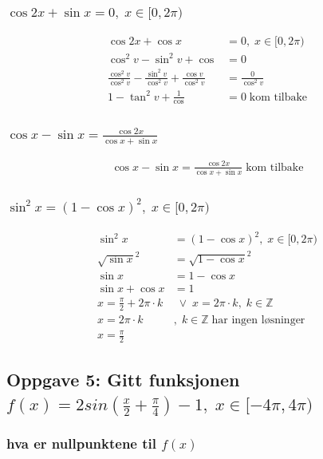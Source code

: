 \documentclass{article}
\begin{document}
\subsubsection{$ \cos 2x + \sin x = 0, \; x\in[0, 2\pi)$}

\begin{align*}
    \cos 2x + \cos x &= 0, \; x\in[0, 2\pi) \\
    \cos^2 v - \sin^2 v + \cos &= 0 \\
    \frac{\cos^2 v}{\cos^2 v} - \frac{\sin^2 v}{\cos^2 v} + \frac{\cos v}{\cos^2 v} &= \frac{0}{\cos^2 v} \\
    1 - \tan^2 v + \frac{1}{\cos} &= 0 \; \text{kom tilbake}
\end{align*}

\subsubsection{$\cos x - \sin x = \frac{\cos 2x}{\cos x + \sin x}$}

\begin{align*}
    \cos x - \sin x = \frac{\cos 2x}{\cos x + \sin x} \; \text{kom tilbake}
\end{align*}

\subsubsection{$\sin^2x = (1-\cos x)^2, \; x \in [0, 2\pi)$}

\begin{align*}
    \sin^2x &= (1-\cos x)^2, \; x \in [0, 2\pi) \\
    \sqrt{\sin x}^2 &= \sqrt{1-\cos x}^2 \\
    \sin x &= 1 - \cos x \\
    \sin x + \cos x &= 1 \\
    x = \frac{\pi}{2} + 2\pi \cdot k &\;\lor\; x = 2\pi \cdot k, \; k \in \mathbb{Z} \\
    x = 2\pi \cdot k &, \; k \in \mathbb{Z} \; \text{har ingen løsninger} \\
    x = \frac{\pi}{2}
\end{align*}

\subsection{Oppgave 5: Gitt funksjonen $f(x)=2sin(\frac{x}{2}+\frac{\pi}{4})-1, \; x \in [-4\pi, 4\pi)$}

\subsubsection{hva er nullpunktene til $f(x)$}
\end{document}
